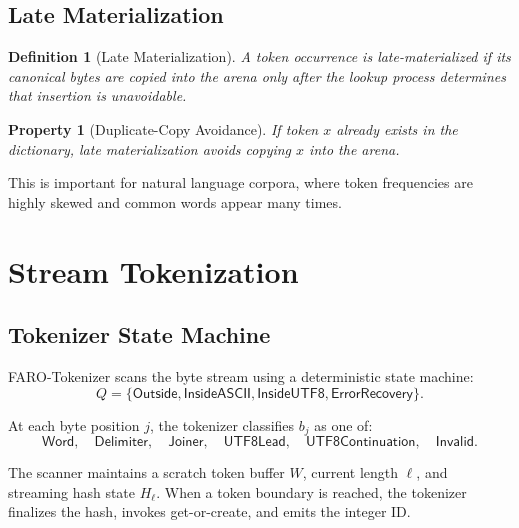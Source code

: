 \documentclass[11pt,a4paper]{article}
\newtheorem{definition}{Definition}
\newtheorem{property}{Property}
\begin{document}
\subsection{Late Materialization}

\begin{definition}[Late Materialization]
A token occurrence is late-materialized if its canonical bytes are copied into the arena only after the lookup process determines that insertion is unavoidable.
\end{definition}

\begin{property}[Duplicate-Copy Avoidance]
If token \(x\) already exists in the dictionary, late materialization avoids copying \(x\) into the arena.
\end{property}

This is important for natural language corpora, where token frequencies are highly skewed and common words appear many times.

\section{Stream Tokenization}

\subsection{Tokenizer State Machine}

FARO-Tokenizer scans the byte stream using a deterministic state machine:
\[
Q=\{\textsf{Outside},\textsf{InsideASCII},\textsf{InsideUTF8},\textsf{ErrorRecovery}\}.
\]

At each byte position \(j\), the tokenizer classifies \(b_j\) as one of:
\[
\textsf{Word},\quad
\textsf{Delimiter},\quad
\textsf{Joiner},\quad
\textsf{UTF8Lead},\quad
\textsf{UTF8Continuation},\quad
\textsf{Invalid}.
\]

The scanner maintains a scratch token buffer \(W\), current length \(\ell\), and streaming hash state \(H_\ell\). When a token boundary is reached, the tokenizer finalizes the hash, invokes get-or-create, and emits the integer ID.
\end{document}
